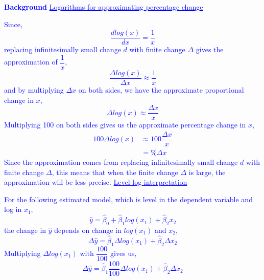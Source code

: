 \documentclass[12pt]{report}
\newenvironment{blueframed}[1][blue]
{\def\FrameCommand{\fboxsep=\FrameSep\fcolorbox{#1}{white}}%
	\MakeFramed {\advance\hsize-\width \FrameRestore}}
{\endMakeFramed}
\begin{document}
\justify
\begin{blueframed}
	\textcolor{blue}{\textbf{Background}}
	\vspace{-\baselineskip}
	\justify
	\textcolor{blue}{\underline{Logarithms for approximating percentage change}}
	
	\noindent \textcolor{blue}
	{
		Since, $$\dfrac{dlog(x)}{dx} = \dfrac{1}{x}$$ replacing infinitesimally small change $d$ with finite change $\Delta$ gives the approximation of $\dfrac{1}{x}$, $$\dfrac{\Delta log(x)}{\Delta x} \approx \dfrac{1}{x}$$ and by multiplying $\Delta x$ on both sides, we have the approximate proportional change in $x$, $$\Delta log(x) \approx \dfrac{\Delta x}{x}$$ Multiplying 100 on both sides gives us the approximate percentage change in $x$, \begin{align*} 
		100\Delta log(x) &\approx 100\dfrac{\Delta x}{x} \\ 
		&= \%\Delta x 
		\end{align*} Since the approximation comes from replacing infinitesimally small change $d$ with finite change $\Delta$, this means that when the finite change $\Delta$ is large, the approximation will be less precise.
	}
	\justify
	\textcolor{blue}{\underline{Level-log interpretation}}
	
	\noindent \textcolor{blue}
	{
		For the following estimated model, which is level in the dependent variable and log in $x_1$, $$\hat{y} = \hat{\beta}_0 + \hat{\beta}_1log(x_1) + \hat{\beta}_2x_2$$ the change in $\hat{y}$ depends on change in $log(x_1)$ and $x_2$, $$\Delta \hat{y} = \hat{\beta}_1\Delta log(x_1) + \hat{\beta}_2\Delta x_2$$ Multiplying $\Delta log(x_1)$ with $\dfrac{100}{100}$ gives us, $$\Delta \hat{y} = \hat{\beta}_1 \dfrac{100}{100}\Delta log(x_1) + \hat{\beta}_2\Delta x_2$$
	}
\end{blueframed}
\end{document}
